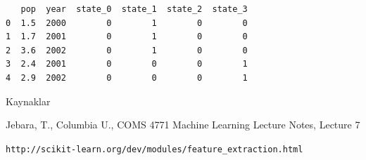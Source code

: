 \documentclass[12pt,fleqn]{article}\usepackage{../common}
\begin{document}
\begin{verbatim}
   pop  year  state_0  state_1  state_2  state_3
0  1.5  2000        0        1        0        0
1  1.7  2001        0        1        0        0
2  3.6  2002        0        1        0        0
3  2.4  2001        0        0        0        1
4  2.9  2002        0        0        0        1
\end{verbatim}

Kaynaklar

Jebara, T., Columbia U., COMS 4771 Machine Learning Lecture Notes, Lecture 7

\verb!http://scikit-learn.org/dev/modules/feature_extraction.html!
\end{document}
